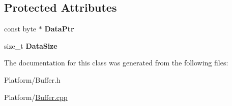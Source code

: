 \subsection*{Protected Attributes}
\begin{DoxyCompactItemize}
\item 
\mbox{\label{class_gost_crypt_1_1_const_buffer_ptr_a655a343b7154a5f888846a7bff8ea479}} 
const byte $\ast$ {\bfseries Data\+Ptr}
\item 
\mbox{\label{class_gost_crypt_1_1_const_buffer_ptr_a12dee8df5c979355c2b48c4f0992c32c}} 
size\+\_\+t {\bfseries Data\+Size}
\end{DoxyCompactItemize}


The documentation for this class was generated from the following files\+:\begin{DoxyCompactItemize}
\item 
Platform/Buffer.\+h\item 
Platform/\hyperlink{_buffer_8cpp}{Buffer.\+cpp}\end{DoxyCompactItemize}
